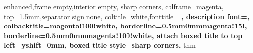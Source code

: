 \usepackage[left=1.1in,right=1.1in]{geometry}
\usepackage[secthm,mdthm]{evan}
\usepackage[most]{tcolorbox}
\usepackage{cancel}
\usepackage[labelfont=bf,sf, font=sf]{caption}
\usepackage{bm}


\newcommand{\bsquare}{\hfill$\blacksquare$\par\medskip}
\newcommand{\PP}{\mathbb{P}}
\newenvironment{sol}{%
     \par\medskip\noindent\textit{Solution.}}{%
     \hfill$\blacksquare$\par\medskip}


%
    {enhanced,frame empty,interior empty, sharp corners, colframe=magenta, top=1.5mm,separator sign none, coltitle=white,fonttitle=
    \sffamily \bfseries, description font=\mdseries\sffamily, colbacktitle=magenta!100!white,
        borderline={0.5mm}{0mm}{magenta!15!},
        borderline={0.5mm}{0mm}{magenta!100!white},
        attach boxed title to top left={yshift=0mm},
        boxed title style=sharp corners,
    }{thm} %

\makeatletter
\renewcommand*{\eqref}[1]{%
  \hyperref[{#1}]{\textup{\tagform@{\ref*{#1}}}}%
}
\makeatother
